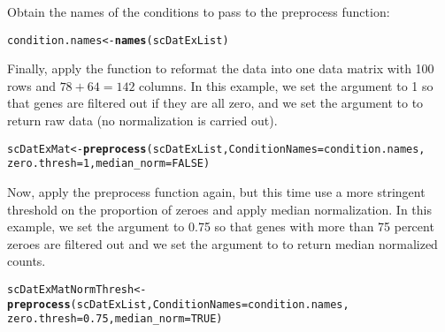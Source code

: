 \documentclass{article}\usepackage[]{graphicx}\usepackage[]{color}
\makeatletter
\newcommand{\hlnum}[1]{\textcolor[rgb]{0.686,0.059,0.569}{#1}}%
\newcommand{\hlstd}[1]{\textcolor[rgb]{0.345,0.345,0.345}{#1}}%
\newcommand{\hlkwb}[1]{\textcolor[rgb]{0.69,0.353,0.396}{#1}}%
\newcommand{\hlkwc}[1]{\textcolor[rgb]{0.333,0.667,0.333}{#1}}%
\newcommand{\hlkwd}[1]{\textcolor[rgb]{0.737,0.353,0.396}{\textbf{#1}}}%
\newenvironment{kframe}{%
 \def\at@end@of@kframe{}%
 \ifinner\ifhmode%
  \def\at@end@of@kframe{\end{minipage}}%
  \begin{minipage}{\columnwidth}%
 \fi\fi%
 \def\FrameCommand##1{\hskip\@totalleftmargin \hskip-\fboxsep
 \colorbox{shadecolor}{##1}\hskip-\fboxsep
     \hskip-\linewidth \hskip-\@totalleftmargin \hskip\columnwidth}%
 \MakeFramed {\advance\hsize-\width
   \@totalleftmargin\z@ \linewidth\hsize
   \@setminipage}}%
 {\par\unskip\endMakeFramed%
 \at@end@of@kframe}
\newenvironment{knitrout}{}{} %
\makeatother
\begin{document}
Obtain the names of the conditions to pass to the preprocess function:
\begin{knitrout}
\color{fgcolor}\begin{kframe}
\begin{alltt}
\hlstd{condition.names} \hlkwb{<-} \hlkwd{names}\hlstd{(scDatExList)}
\end{alltt}
\end{kframe}
\end{knitrout}

Finally, apply the  function to reformat the data into one data matrix with 100 rows and $78+64=142$ columns.  In this example, we set the  argument to 1 so that genes are filtered out if they are all zero, and we set the  argument to  to return raw data (no normalization is carried out).

\begin{knitrout}
\color{fgcolor}\begin{kframe}
\begin{alltt}
\hlstd{scDatExMat} \hlkwb{<-} \hlkwd{preprocess}\hlstd{(scDatExList,} \hlkwc{ConditionNames}\hlstd{=condition.names,}
                        \hlkwc{zero.thresh}\hlstd{=}\hlnum{1}\hlstd{,} \hlkwc{median_norm}\hlstd{=}\hlnum{FALSE}\hlstd{)}
\end{alltt}
\end{kframe}
\end{knitrout}

Now, apply the preprocess function again, but this time use a more stringent threshold on the proportion of zeroes and apply median normalization.  In this example, we set the  argument to 0.75 so that genes with more than 75 percent zeroes are filtered out and we set the  argument to  to return median normalized counts.

\begin{knitrout}
\color{fgcolor}\begin{kframe}
\begin{alltt}
\hlstd{scDatExMatNormThresh} \hlkwb{<-} \hlkwd{preprocess}\hlstd{(scDatExList,} \hlkwc{ConditionNames}\hlstd{=condition.names,}
                                   \hlkwc{zero.thresh}\hlstd{=}\hlnum{0.75}\hlstd{,} \hlkwc{median_norm}\hlstd{=}\hlnum{TRUE}\hlstd{)}
\end{alltt}
\end{kframe}
\end{knitrout}
\end{document}
